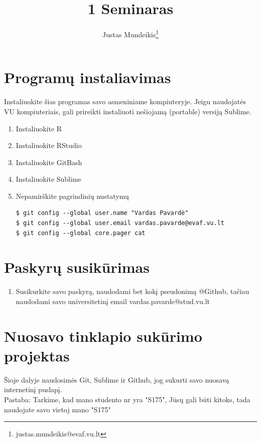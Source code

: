\documentclass[11pt,a4paper]{article}
\author{Justas Mundeikis\thanks{justas.mundeikis@evaf.vu.lt}}
\title{1 Seminaras}
\begin{document}
\maketitle
\section{Programų instaliavimas}
Instaliuokite šias programas savo asmeniniame kompiuteryje. Jeigu naudojatės VU kompiuteriais, gali prireikti instaliuoti nešiojamą (portable) versiją Sublime.

\begin{enumerate}
\item Instaliuokite R
\item Instaliuokite RStudio
\item Instaliuokite GitBash
\item Instaliuokite Sublime
\item Nepamirškite pagrindinių nustatymų
\begin{lstlisting}
$ git config --global user.name "Vardas Pavardė"
$ git config --global user.email vardas.pavarde@evaf.vu.lt
$ git config --global core.pager cat 
\end{lstlisting}
\end{enumerate}

\section{Paskyrų susikūrimas}
\begin{enumerate}
\item Susikurkite savo paskyrą, naudodami bet kokį pseudonimą @Github, tačiau naudodami savo universitetinį email vardas.pavarde@stud.vu.lt
\end{enumerate}

\section{Nuosavo tinklapio sukūrimo projektas}
Šioje dalyje naudosimės Git, Sublime ir Github, jog sukurti savo nuosavą internetinį puslapį. 
\\Pastaba: Tarkime, kad mano studento nr yra "S175", Jūsų gali būti kitoks, tada naudojate savo vietoj mano "S175"
\end{document}
